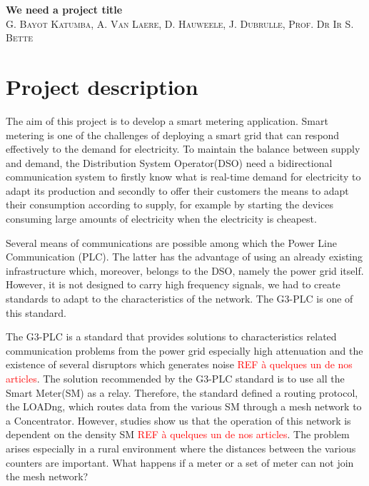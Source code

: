 \documentclass[a4paper,10pt]{article}
\newcommand{\FIXME}[1]{\textcolor{red}{\framebox{FIXME:} #1}}
\begin{document}

\begin{center}
  \huge\textbf{We need a project title}\\
  \vspace{0.5em}
  \small\textsc{G. Bayot Katumba, A. Van Laere, D. Hauweele, J. Dubrulle, Prof. Dr Ir S. Bette}
\end{center}

\section{Project description}

The aim of this project is to develop a smart metering
application. Smart metering is one of the challenges of
deploying a smart grid that can respond effectively to the
demand for electricity. To maintain the balance between
supply and demand, the Distribution System Operator(DSO)
need a bidirectional communication system to firstly know
what is real-time demand for electricity to adapt its
production and secondly to offer their customers the means
to adapt their consumption according to supply, for example
by starting the devices consuming large amounts of
electricity when the electricity is cheapest.

Several means of communications are possible among which the
Power Line Communication (PLC). The latter has the advantage
of using an already existing infrastructure which, moreover,
belongs to the DSO, namely the power grid itself. However,
it is not designed to carry high frequency signals, we had
to create standards to adapt to the characteristics of the
network. The G3-PLC is one of this standard.

The G3-PLC is a standard that provides solutions to
characteristics related communication problems from the
power grid especially high attenuation and the existence of
several disruptors which generates noise \FIXME{REF à
  quelques un de nos articles}. The solution recommended by
the G3-PLC standard is to use all the Smart Meter(SM) as a
relay. Therefore, the standard defined a routing protocol,
the LOADng, which routes data from the various SM through a
mesh network to a Concentrator. However, studies show us
that the operation of this network is dependent on the
density SM \FIXME{REF à quelques un de nos articles}. The problem
arises especially in a rural environment where the distances
between the various counters are important. What happens if
a meter or a set of meter can not join the mesh network?
\end{document}
